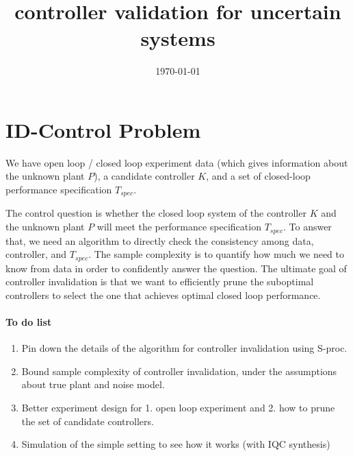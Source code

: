 \documentclass[11pt, onecolumn]{article}
\begin{document}
\title{controller validation for uncertain systems}
\date{\today}



\setcounter{page}{1}


\section{ID-Control Problem}

We have open loop / closed loop experiment data (which gives information about the unknown plant $P$), a
candidate controller $K$, and a set of closed-loop performance specification $T_{spec}$.

The control question is whether the closed loop system of the controller $K$ and the unknown plant
$P$ will meet the performance specification $T_{spec}$.
%
To answer that, we need an algorithm to directly check the consistency among data, controller, and
$T_{spec}$.
%
The sample complexity is to quantify how much we need to know from data in order to confidently
answer the question.
%
The ultimate goal of controller invalidation is that we want to efficiently prune the suboptimal
controllers to select the one that achieves optimal closed loop performance.

\paragraph{To do list }
\begin{enumerate}
\item Pin down the details of the algorithm for controller invalidation using S-proc.
\item Bound sample complexity of controller invalidation, under the assumptions about true plant and noise
  model.
\item Better experiment design for 1. open loop experiment and 2. how to prune the set of candidate controllers.
\item Simulation of the simple setting to see how it works (with IQC synthesis)
\end{enumerate}
\end{document}
